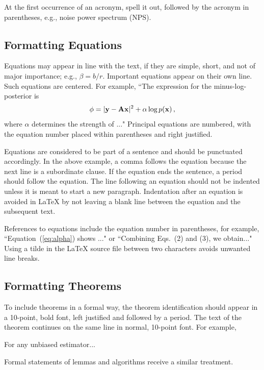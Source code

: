 \documentclass[]{spie}  %
\begin{document}
At the first occurrence of an acronym, spell it out, followed by the acronym in parentheses, e.g., noise power spectrum (NPS).  
 
\subsection{Formatting Equations} 
Equations may appear in line with the text, if they are simple, short, and not of major importance; e.g., $\beta = b/r$.  Important equations appear on their own line.  Such equations are centered.  For example, ``The expression for the minus-log-posterior is
	\begin{equation}
	\label{eq:alpha}
\phi = |{\rm\bf y} - {\rm\bf A}{\rm\bf x}|^2 + \alpha \log p({\rm\bf x}) \, ,
	\end{equation}
where $\alpha$ determines the strength of ..."  Principal equations are numbered, with the equation number placed within parentheses and right justified.  

Equations are considered to be part of a sentence and should be punctuated accordingly. In the above example, a comma follows the equation because the next line is a subordinate clause.  If the equation ends the sentence, a period should follow the equation.  The line following an equation should not be indented unless it is meant to start a new paragraph.  Indentation after an equation is avoided in LaTeX by not leaving a blank line between the equation and the subsequent text.

References to equations include the equation number in parentheses, for example, ``Equation~(\ref{eq:alpha}) shows ..." or ``Combining Eqs.~(2) and (3), we obtain..."  Using a tilde in the LaTeX source file between two characters avoids unwanted line breaks.

\subsection{Formatting Theorems} 

To include theorems in a formal way, the theorem identification should appear in a 10-point, bold font, left justified and followed by a period.  The text of the theorem continues on the same line in normal, 10-point font.  For example, 

 For any unbiased estimator...

Formal statements of lemmas and algorithms receive a similar treatment.
\end{document}
